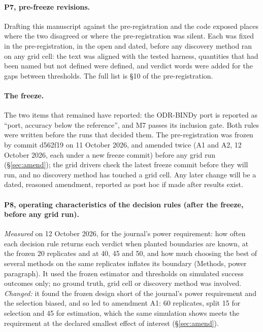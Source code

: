 \documentclass[11pt]{article}
\begin{document}
\paragraph{P7, pre-freeze revisions.}
Drafting this manuscript against the pre-registration and the code exposed places where
the two disagreed or where the pre-registration was silent. Each was fixed in the
pre-registration, in the open and dated, before any discovery method ran on any grid cell:
the text was aligned with the tested harness, quantities that had been named but not
defined were defined, and verdict words were added for the gaps between thresholds. The
full list is \S10 of the pre-registration.

\paragraph{The freeze.}
The two items that remained have reported: the ODR-BINDy port is reported as ``port,
accuracy below the reference'', and M7 passes its inclusion gate. Both rules were written
before the runs that decided them. The pre-registration was frozen by commit d562f19 on
11 October 2026, and amended twice (A1 and A2, 12 October 2026, each under a new freeze
commit) before any grid run (\S\ref{sec:amend}); the grid drivers check the latest freeze commit before
they will run, and no discovery method has touched a grid cell. Any later change will be a dated, reasoned amendment,
reported as post hoc if made after results exist.

\paragraph{P8, operating characteristics of the decision rules (after the freeze, before any
grid run).}
\emph{Measured} on 12 October 2026, for the journal's power requirement: how often each
decision rule returns each verdict when planted boundaries are known, at the frozen 20
replicates and at 40, 45 and 50, and how much choosing the best of several methods on the
same replicates inflates its boundary (Methods, power paragraph). It used the frozen
estimator and thresholds on simulated success outcomes only; no ground truth, grid cell or
discovery method was involved.
\emph{Changed:} it found the frozen design short of the journal's power requirement and the
selection biased, and so led to amendment A1: 60 replicates, split 15 for selection and 45
for estimation, which the same simulation shows meets the requirement at the declared
smallest effect of interest (\S\ref{sec:amend}).
\end{document}
